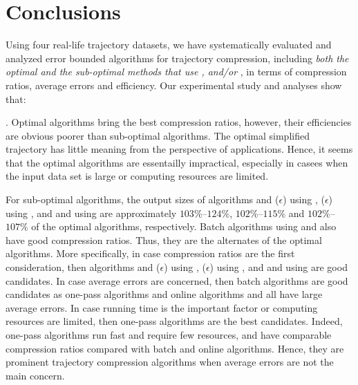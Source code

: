\vspace{-1ex}
\section{Conclusions}

Using four real-life trajectory datasets, we have systematically evaluated and analyzed error bounded \lsa algorithms for trajectory compression, including \emph{both the optimal and the sub-optimal methods that use \ped, \sed and/or \dad},  in terms of compression ratios, average errors and efficiency.
Our experimental study and analyses show that:


. Optimal algorithms bring the best compression ratios, however, their efficiencies are obvious poorer than sub-optimal algorithms. The optimal simplified trajectory has little meaning from the perspective of applications. Hence, it seems that the optimal algorithms are essentailly impractical, especially in casees when the input data set is large or computing resources are limited.

For sub-optimal algorithms, the output sizes of algorithms \bqsa and \siped($\epsilon$) using \ped, \cised($\epsilon$) using \sed, and \tpa and \interval using \dad are approximately $103\%$--$124\%$, $102\%$--$115\%$ and $102\%$--$107\%$ of the optimal algorithms, respectively. Batch algorithms using \ped and \sed also have good compression ratios. Thus, they are the alternates of the optimal algorithms.
%
More specifically, in case compression ratios are the first consideration, then algorithms \bqsa and \siped($\epsilon$) using \ped, \cised($\epsilon$) using \sed, and \tpa and \interval using \dad are good candidates.
%
In case average errors are concerned, then batch algorithms are good candidates as one-pass algorithms and online algorithms \opwa and \bqsa all have large average errors. %
%
In case running time is the important factor or computing resources are limited, then one-pass algorithms are the best candidates.
%
Indeed, one-pass algorithms run fast and require few resources, and have comparable compression ratios compared with batch and online algorithms. Hence, they are prominent trajectory compression algorithms when average errors are not the main concern.

